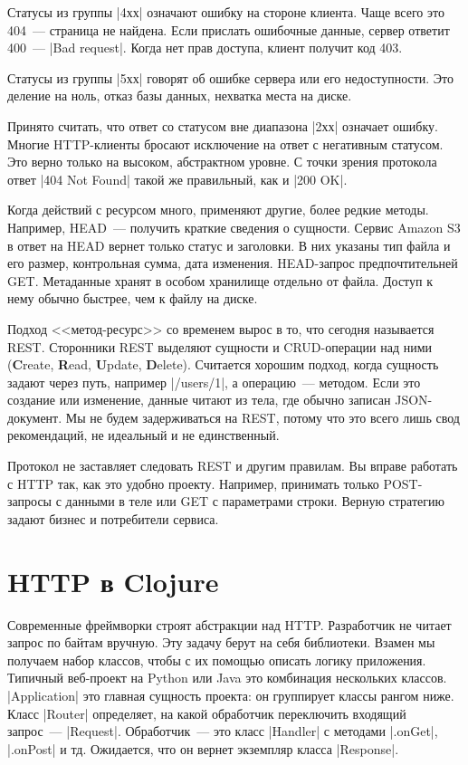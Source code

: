 Статусы из группы \spverb|4хх| означают ошибку на стороне клиента. Чаще всего
это 404~--- страница не найдена. Если прислать ошибочные данные, сервер ответит
400~--- \spverb|Bad request|. Когда нет прав доступа, клиент получит код 403.

Статусы из группы \spverb|5хх| говорят об ошибке сервера или его
недоступности. Это деление на ноль, отказ базы данных, нехватка места на диске.

Принято считать, что ответ со статусом вне диапазона \spverb|2хх| означает
ошибку. Многие HTTP-клиенты бросают исключение на ответ с негативным статусом.
Это верно только на высоком, абстрактном уровне. С точки зрения протокола ответ
\spverb|404 Not Found| такой же правильный, как и \spverb|200 OK|.

Когда действий с ресурсом много, применяют другие, более редкие
методы. Например, HEAD~--- получить краткие сведения о сущности. Сервис Amazon
S3 в ответ на HEAD вернет только статус и заголовки. В них указаны тип файла и
его размер, контрольная сумма, дата изменения. HEAD-запрос предпочтительней
GET. Метаданные хранят в особом хранилище отдельно от файла. Доступ к нему
обычно быстрее, чем к файлу на диске.

Подход <<метод-ресурс>> со временем вырос в то, что сегодня называется
REST. Сторонники REST выделяют сущности и
CRUD-операции над ними (\textbf{C}reate, \textbf{R}ead, \textbf{U}pdate,
\textbf{D}elete). Считается хорошим подход, когда сущность задают через путь,
например \spverb|/users/1|, а операцию~--- методом. Если это создание или
изменение, данные читают из тела, где обычно записан JSON-документ. Мы не будем
задерживаться на REST, потому что это всего лишь свод рекомендаций, не идеальный
и не единственный.

Протокол не заставляет следовать REST и другим правилам. Вы вправе работать с
HTTP так, как это удобно проекту. Например, принимать только POST-запросы с
данными в теле или GET с параметрами строки. Верную стратегию задают бизнес и
потребители сервиса.

\section{HTTP в Clojure}

Современные фреймворки строят абстракции над HTTP. Разработчик не читает запрос
по байтам вручную. Эту задачу берут на себя библиотеки. Взамен мы получаем набор
классов, чтобы с их помощью описать логику приложения. Типичный веб-проект на
Python или Java это комбинация нескольких классов. \spverb|Application| это
главная сущность проекта: он группирует классы рангом ниже. Класс
\spverb|Router| определяет, на какой обработчик переключить входящий запрос~---
\spverb|Request|. Обработчик~--- это класс \spverb|Handler| с методами
\spverb|.onGet|, \spverb|.onPost| и тд. Ожидается, что он вернет экземпляр
класса \spverb|Response|.

